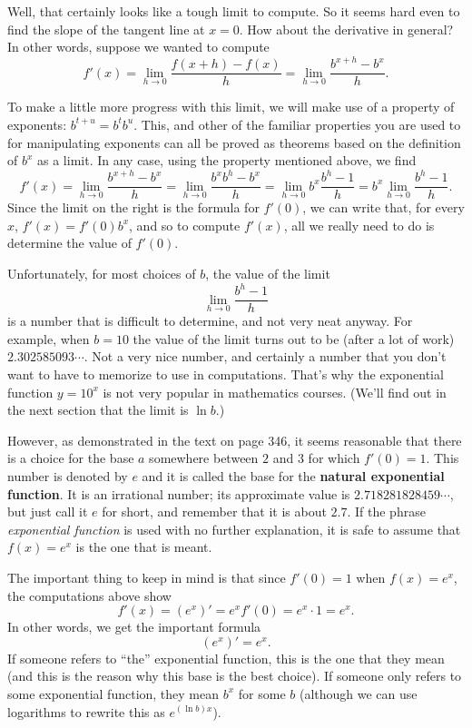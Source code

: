 Well, that certainly looks like a tough limit to compute. So it seems hard
even to find the slope of the tangent line at $x=0$. How about the derivative in
general? In other words, suppose we wanted to compute
\[f'(x)=\lim_{h\to0}\frac{f(x+h)-f(x)}h=\lim_{h\to0}\frac{b^{x+h}-b^x}h.\]

To make a little more progress with this limit, we will make use of
a property of exponents: $b^{t+u}=b^tb^u$. This, and other of the
familiar properties you are used to for manipulating exponents can all
be proved as theorems based on the definition of $b^x$ as a limit. In
any case, using the property mentioned above, we find
\[
 f'(x)=\lim_{h\to0}\frac{b^{x+h}-b^x}h
 =\lim_{h\to0}\frac{b^xb^h-b^x}h
 =\lim_{h\to0}b^x\frac{b^h-1}h
 =b^x\lim_{h\to0}\frac{b^h-1}h.
\]
Since the limit on the right is the formula for $f'(0)$, 
we can write that, for every $x$, $f'(x)=f'(0)b^x$, and
so to compute $f'(x)$, all we really need to do is determine the
value of $f'(0)$.

Unfortunately, for most choices of $b$, the value of the limit
\[\lim_{h\to0}\frac{b^h-1}h\]
is a number that is difficult to determine, and not very neat anyway. For example,
when $b=10$ the value of the limit turns out to be (after a lot of work)
$2.302585093\cdots$. Not a very nice number, and certainly a number that you don't
want to have to memorize to use in computations. That's why the exponential
function $y=10^x$ is not very popular in mathematics courses.
(We'll find out in the next section that the limit is $\ln b$.)

However, as demonstrated in the text on page 346, it seems reasonable that
there is a 
choice for the base $a$ somewhere between $2$ and $3$ for which
$f'(0)=1$. This number is denoted by $e$ and it is called the
base for the \textbf{natural exponential function}. It is an irrational
number; its approximate value is $2.718281828459\cdots$, but just call it $e$ for
short, and remember that it is about $2.7$. If the phrase
\emph{exponential function} is used with no further explanation, it is
safe to assume that $f(x)=e^x$ is the one that is meant.

The important thing to keep in mind is that since $f'(0) = 1$ when
$f(x)=e^x$, the computations above 
show
\[f'(x)=\left(e^x\right)'=e^xf'(0)=e^x\cdot1=e^x.\]
In other words, we get the important formula
\[\left(e^x\right)'=e^x.\]
If someone refers to ``the'' exponential function, this is the one that they
mean (and this is the reason why this base is the best choice).
If someone only refers to some exponential function, they mean $b^x$ for some
$b$ (although we can use logarithms to rewrite this as $e^{(\ln b)x}$).

